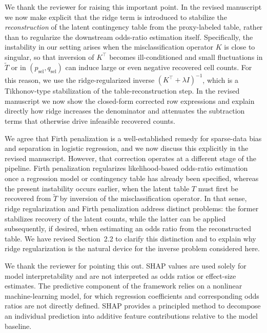\documentclass[onecolumn,11pt]{IEEEtran}
\begin{document}
We thank the reviewer for raising this important point. In the revised manuscript we now make explicit that the ridge term is introduced to stabilize the \emph{reconstruction} of the latent contingency table from the proxy-labeled table, rather than to regularize the downstream odds-ratio estimation itself. Specifically, the instability in our setting arises when the misclassification operator \(K\) is close to singular, so that inversion of \(K^\top\) becomes ill-conditioned and small fluctuations in \(\tilde T\) or in \((p_{\mathrm{sel}}, q_{\mathrm{sel}})\) can induce large or even negative recovered cell counts. For this reason, we use the ridge-regularized inverse \((K^\top + \lambda I)^{-1}\), which is a Tikhonov-type stabilization of the table-reconstruction step. In the revised manuscript we now show the closed-form corrected row expressions and explain directly how ridge increases the denominator and attenuates the subtraction terms that otherwise drive infeasible recovered counts.

We agree that Firth penalization is a well-established remedy for sparse-data bias and separation in logistic regression, and we now discuss this explicitly in the revised manuscript. However, that correction operates at a different stage of the pipeline. Firth penalization regularizes likelihood-based odds-ratio estimation once a regression model or contingency table has already been specified, whereas the present instability occurs earlier, when the latent table \(T\) must first be recovered from \(\tilde T\) by inversion of the misclassification operator. In that sense, ridge regularization and Firth penalization address distinct problems: the former stabilizes recovery of the latent counts, while the latter can be applied subsequently, if desired, when estimating an odds ratio from the reconstructed table. We have revised Section~2.2 to clarify this distinction and to explain why ridge regularization is the natural device for the inverse problem considered here.

We thank the reviewer for pointing this out. SHAP values are used solely for model interpretability and are not interpreted as odds ratios or effect-size estimates. The predictive component of the framework relies on a nonlinear machine-learning model, for which regression coefficients and corresponding odds ratios are not directly defined. SHAP provides a principled method to decompose an individual prediction into additive feature contributions relative to the model baseline. 
\end{document}
